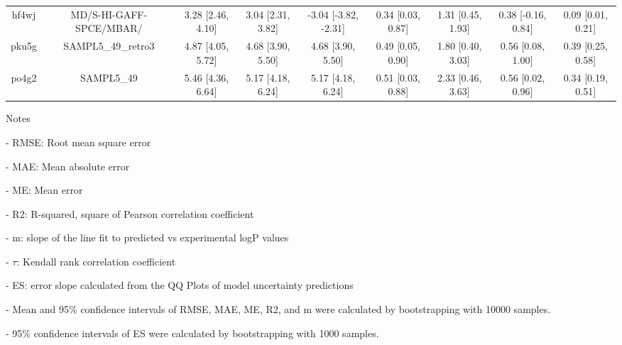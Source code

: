 \documentclass{article}
\begin{document}
\begin{center}
\begin{longtable}{|ccccccccc|}
 hf4wj &                            MD/S-HI-GAFF-SPCE/MBAR/ &  3.28 [2.46, 4.10] &  3.04 [2.31, 3.82] &  -3.04 [-3.82, -2.31] &  0.34 [0.03, 0.87] &    1.31 [0.45, 1.93] &   0.38 [-0.16, 0.84] &     0.09 [0.01, 0.21] \\
 pku5g &                                 SAMPL5\_49\_retro3 &  4.87 [4.05, 5.72] &  4.68 [3.90, 5.50] &     4.68 [3.90, 5.50] &  0.49 [0.05, 0.90] &    1.80 [0.40, 3.03] &    0.56 [0.08, 1.00] &     0.39 [0.25, 0.58] \\
 po4g2 &                                         SAMPL5\_49 &  5.46 [4.36, 6.64] &  5.17 [4.18, 6.24] &     5.17 [4.18, 6.24] &  0.51 [0.03, 0.88] &    2.33 [0.46, 3.63] &    0.56 [0.02, 0.96] &     0.34 [0.19, 0.51] \\
\end{longtable}
\end{center}

Notes

- RMSE: Root mean square error

- MAE: Mean absolute error

- ME: Mean error

- R2: R-squared, square of Pearson correlation coefficient

- m: slope of the line fit to predicted vs experimental logP values

- $\tau$:  Kendall rank correlation coefficient

- ES: error slope calculated from the QQ Plots of model uncertainty predictions

- Mean and 95\% confidence intervals of RMSE, MAE, ME, R2, and m were calculated by bootstrapping with 10000 samples.

- 95\% confidence intervals of ES were calculated by bootstrapping with 1000 samples.\end{document}
\end{document}
